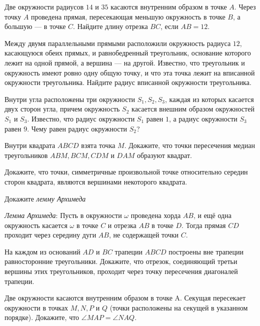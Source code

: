 \documentclass{article}
\begin{document}
    \begin{enumerate_boxed}

        \item Две окружности радиусов $14$ и $35$ касаются внутренним образом в точке $A$.
        Через точку $A$ проведена прямая, пересекающая меньшую окружность в точке $B$, а большую — в точке $C$.
        Найдите длину отрезка $BC$, если $AB=12$.

        \item Между двумя параллельными прямыми расположили окружность радиуса $12$, касающуюся обеих прямых, и равнобедренный треугольник, основание которого лежит на одной прямой, а вершина — на другой.
        Известно, что треугольник и окружность имеют ровно одну общую точку, и что эта точка лежит на вписанной окружности треугольника.
        Найдите радиус вписанной окружности треугольника.

        \item Внутри угла расположены три окружности $S_1, S_2, S_3$, каждая из которых касается двух сторон угла, причем окружность $S_2$ касается внешним образом окружностей $S_1$ и $S_3$.
        Известно, что радиус окружности $S_1$ равен $1$, а радиус окружности $S_3$ равен $9$.
        Чему равен радиус окружности $S_2$?

        \item Внутри квадрата $ABCD$ взята точка $M$.
        Докажите, что точки пересечения медиан треугольников  $ABM, BCM, CDM$ и $DAM$ образуют квадрат.

        \item Докажите, что точки, симметричные произвольной точке относительно середин сторон квадрата, являются вершинами некоторого квадрата.

        \item Докажите \textit{лемму Архимеда}

        \textit{Лемма Архимеда}: Пусть в окружности $\omega$ проведена хорда $AB$, и ещё одна окружность касается $\omega$ в точке $C$ и отрезка $AB$ в точке $D$.
        Тогда прямая $CD$ проходит через середину дуги $AB$, не содержащей точки $C$.

        \item На каждом из оснований $AD$ и $BC$ трапеции $ABCD$ построены вне трапеции равносторонние треугольники.
        Докажите, что отрезок, соединяющий третьи вершины этих треугольников, проходит через точку пересечения диагоналей трапеции.

        \item Две окружности касаются внутренним образом в точке A. Секущая пересекает окружности в точках $M, N, P$ и $Q$ (точки расположены на секущей в указанном порядке).
        Докажите, что $\angle MAP=\angle NAQ$.


\end{enumerate_boxed}
\end{document}
